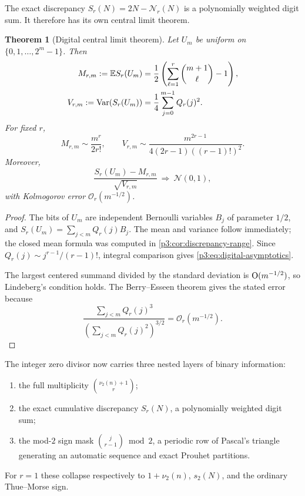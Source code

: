 \documentclass[11pt,oneside]{article}
\newtheorem{theorem}{Theorem}[section]
\theoremstyle{definition}
\theoremstyle{remark}
\newcommand{\bigO}{\mathcal O}
\begin{document}
The exact discrepancy $S_r(N)=2N-\mathcal N_r(N)$ is a polynomially weighted digit sum.  It therefore has its own central limit theorem.

\begin{theorem}[Digital central limit theorem]\label{p3:thm:digital-clt}
Let $U_m$ be uniform on $\{0,1,\ldots,2^m-1\}$.  Then
\begin{align}
 M_{r,m}:=\mathbb E S_r(U_m)
 &=\frac12\left(\sum_{\ell=1}^{r}\binom{m+1}{\ell}-1\right),\label{p3:eq:digital-mean}\\
 V_{r,m}:=\operatorname{Var}(S_r(U_m))
 &=\frac14\sum_{j=0}^{m-1}Q_r(j)^2.\label{p3:eq:digital-var}
\end{align}
For fixed $r$,
\begin{equation}\label{p3:eq:digital-asymptotics}
 M_{r,m}\sim\frac{m^r}{2r!},
 \qquad
 V_{r,m}\sim
 \frac{m^{2r-1}}{4(2r-1)((r-1)!)^2}.
\end{equation}
Moreover,
\begin{equation}\label{p3:eq:digital-clt}
 \frac{S_r(U_m)-M_{r,m}}{\sqrt{V_{r,m}}}
 \ \Longrightarrow\ \mathcal N(0,1),
\end{equation}
with Kolmogorov error $\bigO_r(m^{-1/2})$.
\end{theorem}

\begin{proof}
The bits of $U_m$ are independent Bernoulli variables $B_j$ of parameter $1/2$, and
$S_r(U_m)=\sum_{j<m}Q_r(j)B_j$.  The mean and variance follow immediately; the closed mean formula was computed in \cref{p3:cor:discrepancy-range}.  Since
$Q_r(j)\sim j^{r-1}/(r-1)!$, integral comparison gives \eqref{p3:eq:digital-asymptotics}.

The largest centered summand divided by the standard deviation is $\mathrm O(m^{-1/2})$, so Lindeberg's condition holds.  The Berry--Esseen theorem \cite{p3:feller} gives the stated error because
\[
 \frac{\sum_{j<m}Q_r(j)^3}{\left(\sum_{j<m}Q_r(j)^2\right)^{3/2}}
 =\bigO_r(m^{-1/2}).
\]
\end{proof}

\begin{resultbox}
The integer zero divisor now carries three nested layers of binary information:
\begin{enumerate}[label=\arabic*.]
\item the full multiplicity $\binom{\nu_2(n)+1}{r}$;
\item the exact cumulative discrepancy $S_r(N)$, a polynomially weighted digit sum;
\item the mod-$2$ sign mask $\binom j{r-1}\bmod2$, a periodic row of Pascal's triangle generating an automatic sequence and exact Prouhet partitions.
\end{enumerate}
For $r=1$ these collapse respectively to $1+\nu_2(n)$, $s_2(N)$, and the ordinary Thue--Morse sign.
\end{resultbox}
\end{document}
